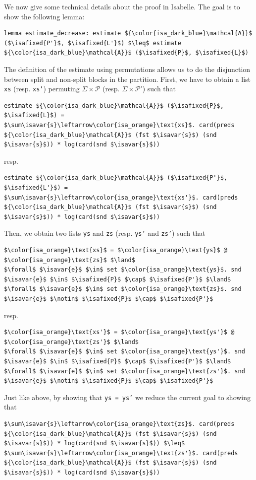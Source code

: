 \documentclass[12pt, a4 paper]{article}
\newcommand{\isavar}[1]{{\color{isa_dark_green}\text{#1}}}
\newcommand{\isafixed}[1]{{\color{isa_dark_blue}\text{#1}}}
\theoremstyle{definition}
\begin{document}
\bigskip

We now give some technical details about the proof in Isabelle. The goal is to show the following lemma:

\begin{lstlisting}[language=Isabelle]
lemma estimate_decrease: estimate ${\color{isa_dark_blue}\mathcal{A}}$ ($\isafixed{P'}$, $\isafixed{L'}$) $\leq$ estimate ${\color{isa_dark_blue}\mathcal{A}}$ ($\isafixed{P}$, $\isafixed{L}$)
\end{lstlisting}


The definition of the estimate using permutations allows us to do the disjunction between split and non-split blocks in the partition. First, we have to obtain a list \texttt{xs} (resp. \texttt{xs'}) permuting $\Sigma \times \mathcal{P}$ (resp. $\Sigma \times \mathcal{P'}$) such that
\begin{lstlisting}[language=Isabelle]
estimate ${\color{isa_dark_blue}\mathcal{A}}$ ($\isafixed{P}$, $\isafixed{L}$) = $\sum\isavar{s}\leftarrow\color{isa_orange}\text{xs}$. card(preds ${\color{isa_dark_blue}\mathcal{A}}$ (fst $\isavar{s}$) (snd $\isavar{s}$)) * log(card(snd $\isavar{s}$))
\end{lstlisting}
resp.
\begin{lstlisting}[language=Isabelle]
estimate ${\color{isa_dark_blue}\mathcal{A}}$ ($\isafixed{P'}$, $\isafixed{L'}$) = $\sum\isavar{s}\leftarrow\color{isa_orange}\text{xs'}$. card(preds ${\color{isa_dark_blue}\mathcal{A}}$ (fst $\isavar{s}$) (snd $\isavar{s}$)) * log(card(snd $\isavar{s}$))
\end{lstlisting}
Then, we obtain two lists \texttt{ys} and \texttt{zs} (resp. \texttt{ys'} and \texttt{zs'}) such that
\begin{lstlisting}[language=Isabelle]
$\color{isa_orange}\text{xs}$ = $\color{isa_orange}\text{ys}$ @ $\color{isa_orange}\text{zs}$ $\land$
$\forall$ $\isavar{e}$ $\in$ set $\color{isa_orange}\text{ys}$. snd $\isavar{e}$ $\in$ $\isafixed{P}$ $\cap$ $\isafixed{P'}$ $\land$
$\forall$ $\isavar{e}$ $\in$ set $\color{isa_orange}\text{zs}$. snd $\isavar{e}$ $\notin$ $\isafixed{P}$ $\cap$ $\isafixed{P'}$
\end{lstlisting}
resp.
\begin{lstlisting}[language=Isabelle]
$\color{isa_orange}\text{xs'}$ = $\color{isa_orange}\text{ys'}$ @ $\color{isa_orange}\text{zs'}$ $\land$
$\forall$ $\isavar{e}$ $\in$ set $\color{isa_orange}\text{ys'}$. snd $\isavar{e}$ $\in$ $\isafixed{P}$ $\cap$ $\isafixed{P'}$ $\land$
$\forall$ $\isavar{e}$ $\in$ set $\color{isa_orange}\text{zs'}$. snd $\isavar{e}$ $\notin$ $\isafixed{P}$ $\cap$ $\isafixed{P'}$
\end{lstlisting}
Just like above, by showing that \texttt{ys = ys'} we reduce the current goal to showing that
\begin{lstlisting}[language=Isabelle]
$\sum\isavar{s}\leftarrow\color{isa_orange}\text{zs}$. card(preds ${\color{isa_dark_blue}\mathcal{A}}$ (fst $\isavar{s}$) (snd $\isavar{s}$)) * log(card(snd $\isavar{s}$)) $\leq$
$\sum\isavar{s}\leftarrow\color{isa_orange}\text{zs'}$. card(preds ${\color{isa_dark_blue}\mathcal{A}}$ (fst $\isavar{s}$) (snd $\isavar{s}$)) * log(card(snd $\isavar{s}$))
\end{lstlisting}
\end{document}
